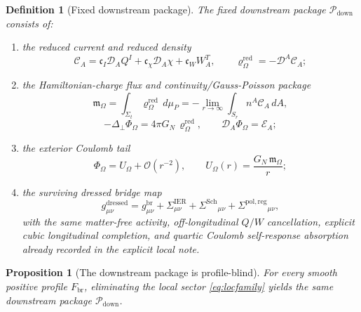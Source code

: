 \documentclass[11pt]{article}
\newcommand{\SpatialD}{\mathcal D}
\newcommand{\LapPerp}{\Delta_\perp}
\newcommand{\FlowPot}{\Phi_\Omega}
\newcommand{\CoulPot}{U_\Omega}
\newcommand{\SourceDensityRed}{\varrho_\Omega^{\mathrm{red}}}
\newcommand{\ConstCurrent}{\mathcal C}
\newcommand{\HamChargeOmega}{\mathfrak m_\Omega}
\newcommand{\SigmaIER}{\Sigma^{\mathrm{IER}}}
\newcommand{\SigmaDressSch}{\Sigma^{\mathrm{Sch}}}
\newcommand{\SigmaRegPol}{\Sigma^{\mathrm{pol,reg}}}
\newcommand{\CurvProfile}{F_{\mathrm{br}}}
\newcommand{\DownPkg}{\mathscr P_{\mathrm{down}}}
\newtheorem{definition}{Definition}
\newtheorem{proposition}{Proposition}
\begin{document}
\begin{definition}[Fixed downstream package]
\label{def:downstream}
The \emph{fixed downstream package} \(\DownPkg\) consists of:
\begin{enumerate}
    \item the reduced current and reduced density
    \begin{equation}
    \ConstCurrent_A
    =
    \mathfrak c_I\SpatialD_AQ^I
    +\mathfrak c_\chi\SpatialD_A\chi
    +\mathfrak c_WW_A^T,
    \qquad
    \SourceDensityRed=-\SpatialD^A\ConstCurrent_A;
    \label{eq:pkgcurrent}
    \end{equation}
    \item the Hamiltonian-charge flux and continuity/Gauss-Poisson package
    \begin{equation}
    \HamChargeOmega
    =
    \int_{\Sigma_t}\SourceDensityRed\,d\mu_P
    =
    -\lim_{r\to\infty}\int_{S_r} n^A\ConstCurrent_A\,dA,
    \label{eq:pkgcharge}
    \end{equation}
    \begin{equation}
    -\LapPerp\FlowPot=4\pi G_N\,\SourceDensityRed,
    \qquad
    \SpatialD_A\FlowPot=\mathcal E_A;
    \label{eq:pkgpoisson}
    \end{equation}
    \item the exterior Coulomb tail
    \begin{equation}
    \FlowPot
    =
    \CoulPot+\mathcal O(r^{-2}),
    \qquad
    \CoulPot(r)=\frac{G_N\,\HamChargeOmega}{r};
    \label{eq:pkgcoul}
    \end{equation}
    \item the surviving dressed bridge map
    \begin{equation}
    g_{\mu\nu}^{\mathrm{dressed}}
    =
    g_{\mu\nu}^{\mathrm{br}}
    +\SigmaIER_{\mu\nu}
    +\SigmaDressSch{}_{\mu\nu}
    +\SigmaRegPol{}_{\mu\nu},
    \label{eq:pkgmetric}
    \end{equation}
    with the same matter-free activity, off-longitudinal \(Q/W\) cancellation, explicit cubic longitudinal completion, and quartic Coulomb self-response absorption already recorded in the explicit local note.
\end{enumerate}
\end{definition}

\begin{proposition}[The downstream package is profile-blind]
\label{prop:profileblind}
For every smooth positive profile \(\CurvProfile\), eliminating the local sector \eqref{eq:locfamily} yields the same downstream package \(\DownPkg\).
\end{proposition}
\end{document}
